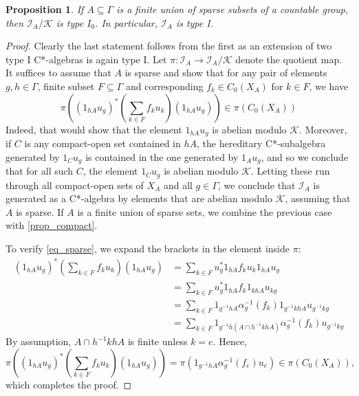 \documentclass[10pt,a4paper]{amsart}
\newtheorem{proposition}{Proposition}
\newcommand{\I}{\mathscr{I}}
\newcommand{\K}{\mathscr{K}}
\begin{document}
	\begin{proposition}
		If \(A \subseteq \Gamma\) is a finite union of sparse subsets of a countable group, then \(\I_A/ \K\) is type \(I_0\). In particular, \(\I_A\) is type I. 
	\end{proposition}

	\begin{proof} 
		Clearly the last statement follows from the first as an extension of two type I C*-algebras is again type I. Let \(\pi \colon \I_A \to \I_A/\K\) denote the quotient map. It suffices to assume that \(A\) is sparse and show that for any pair of elements \(g,h \in \Gamma\), finite subset \(F \subseteq \Gamma\) and corresponding \(f_k \in C_0(X_A)\) for \(k \in F\), we have 
		\begin{equation}
			\label{eq_sparse}
		\pi \left( (1_{hA}u_g)^* \left( \sum_{k \in F} f_k u_k \right) (1_{hA}u_g) \right) \in \pi(C_0(X_A))
		\end{equation}
		Indeed, that would show that the element \(1_{hA}u_g\) is abelian modulo \(\K\). Moreover, if \(C\) is any compact-open set contained in \(hA\), the hereditary C*-subalgebra generated by \(1_Cu_g\) is contained in the one generated by \(1_A u_g\), and so we conclude that for all such \(C\), the element \(1_Cu_g\) is abelian modulo \(\K\). Letting these run through all compact-open sets of \(X_A\) and all \(g \in \Gamma\), we conclude that \(\I_A\) is generated as a C*-algebra by elements that are abelian modulo \(\K\), assuming that \(A\) is sparse. If \(A\) is a finite union of sparse sets, we combine the previous case with \cref{prop_compact}.
		
		To verify \cref{eq_sparse}, we expand the brackets in the element inside \(\pi\): 
		\begin{align*}
			(1_{hA}u_g)^* \left( \sum_{k \in F} f_k u_k \right) (1_{hA}u_g) &= \sum_{k \in F} u_g^* 1_{hA} f_k u_k 1_{hA} u_g \\
			&= \sum_{k \in F} u_g^* 1_{hA} f_k 1_{khA} u_{kg} \\
			&= \sum_{k \in F} 1_{g^{-1} hA} \alpha_g^{-1}(f_k) 1_{g^{-1}khA} u_{g^{-1}k g} \\
			&= \sum_{k \in F} 1_{g^{-1}h(A \cap h^{-1}khA)} \alpha_g^{-1}(f_k) u_{g^{-1}kg}
		\end{align*}
		By assumption, \(A \cap h^{-1}khA\) is finite unless \(k = e\). Hence, 
		\[	\pi \left( (1_{hA}u_g)^* \left( \sum_{k \in F} f_k u_k \right) (1_{hA}u_g) \right) = \pi(1_{g^{-1}hA} \alpha_g^{-1}(f_e) u_e) \in \pi(C_0(X_A)),\]
		which completes the proof. 
	\end{proof}
\end{document}
